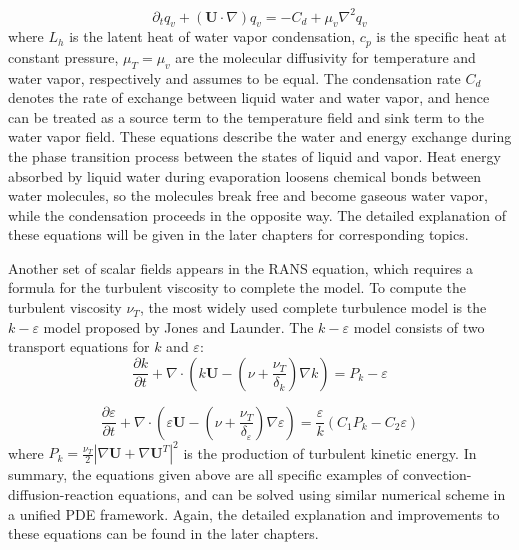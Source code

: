 \begin{equation}
\partial_{t}q_{v}+(\mathbf{U}\cdot\nabla)q_{v}=-C_{d}+\mu_{v}\nabla^{2}q_{v}\label{eq:vap_eqn}
\end{equation}
where $L_{h}$ is the latent heat of water vapor condensation, $c_{p}$ is the specific heat at constant pressure, $\mu_{T}=\mu_{v}$ are the molecular diffusivity for temperature and water vapor, respectively and assumes to be equal. The condensation rate $C_{d}$ denotes the rate of exchange between liquid water and water vapor, and hence can be treated as a source term to the temperature field and sink term to the water vapor field. These equations describe the water and energy exchange during the phase transition process between the states of liquid and vapor. Heat energy absorbed by liquid water during evaporation loosens chemical bonds between water molecules, so the molecules break free and become gaseous water vapor, while the condensation proceeds in the opposite way. The detailed explanation of these equations will be given in the later chapters for corresponding topics.

Another set of scalar fields appears in the RANS equation, which requires a formula for the turbulent viscosity to complete the model. To compute the turbulent viscosity $\nu_T$, the most widely used complete turbulence model is the $k-\varepsilon$ model proposed by Jones and Launder\cite{JonesPrediction1972}. The $k-\varepsilon$ model consists of two transport equations for $k$ and $\varepsilon$:
\begin{equation} 
\frac{\partial k}{\partial t}
+\nabla\cdot(k\mathbf{U}
-(\nu+\frac{\nu_T}{\delta_k})\nabla k) 
= P_k - \varepsilon
\end{equation}

\begin{equation} 
\frac{\partial
\varepsilon}{\partial t}+\nabla\cdot(\varepsilon \mathbf{U}
-(\nu+\frac{\nu_T}{\delta_\varepsilon})\nabla \varepsilon)
=\frac{\varepsilon}{k}(C_1P_k-C_2\varepsilon) \label{eq:eps_eqn} \end{equation}
where $P_k = \frac{\nu_T}{2}|\nabla \mathbf{U} + \nabla \mathbf{U}^T|^2$ is the production of turbulent kinetic energy. In summary, the equations given above are all specific examples of convection-diffusion-reaction equations, and can be solved using similar numerical scheme in a unified PDE framework. Again, the detailed explanation and improvements to these equations can be found in the later chapters.


